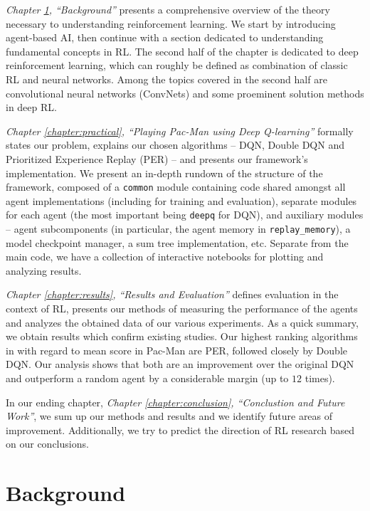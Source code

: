 \documentclass[12pt,twoside]{report}
\begin{document}
\emph{Chapter \ref{chapter:background}, ``Background''} presents a comprehensive overview of the theory necessary to understanding reinforcement learning.
We start by introducing agent-based AI, then continue with a
section dedicated to understanding fundamental concepts in RL.
The second half of the chapter is dedicated to deep reinforcement learning, which can roughly be defined as combination of classic RL and neural networks.
Among the topics covered in the second half are convolutional neural networks (ConvNets) and some proeminent solution methods in deep RL.

\emph{Chapter \ref{chapter:practical}, ``Playing Pac-Man using Deep Q-learning''} formally states our problem, explains our chosen algorithms -- DQN, Double DQN and Prioritized Experience Replay (PER) -- and presents our framework's implementation.
We present an in-depth rundown of the structure of the framework, composed of a \texttt{common} module containing code shared amongst all agent implementations (including for training and evaluation), separate modules for each agent (the most important being \texttt{deepq} for DQN), and auxiliary modules -- agent subcomponents (in particular, the agent memory in \verb|replay_memory|), a model checkpoint manager, a sum tree implementation, etc.
Separate from the main code, we have a collection of interactive notebooks for plotting and analyzing results.

\emph{Chapter \ref{chapter:results}, ``Results and Evaluation''} defines evaluation in the context of RL, presents our methods of measuring the performance of the agents and analyzes the obtained data of our various experiments.
As a quick summary, we obtain results which confirm existing studies. Our highest ranking algorithms in with regard to mean score in Pac-Man are PER, followed closely by Double DQN.
Our analysis shows that both are an improvement over the original DQN and outperform a random agent by a considerable margin (up to $12$ times).

In our ending chapter, \emph{Chapter \ref{chapter:conclusion}, ``Conclustion and Future Work''}, we sum up our methods and results and we identify future areas of improvement. Additionally, we try to predict the direction of RL research based on our conclusions.

\chapter{Background} \label{chapter:background}

\end{document}
